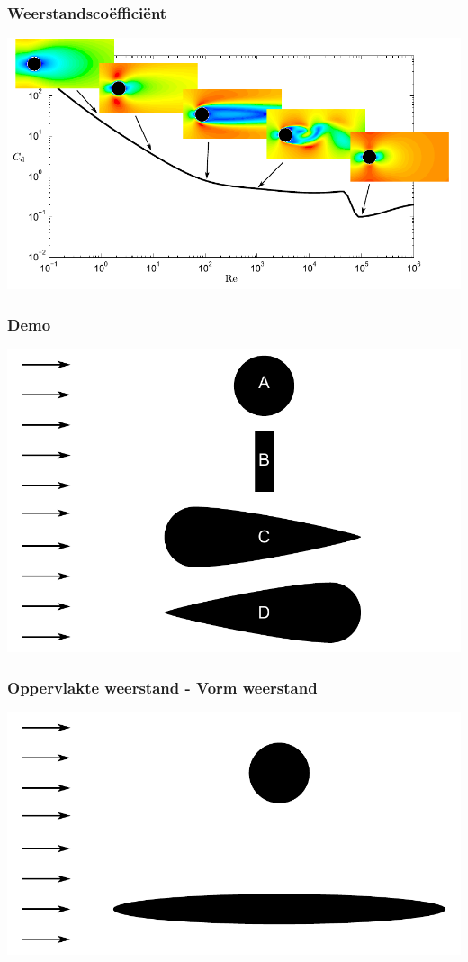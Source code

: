 \documentclass[t]{beamer}
\begin{document}
  	\begin{frame}
  		\frametitle{Weerstandscoëfficiënt}
  		\center
  		\includegraphics[width=\textwidth]{fig/uitwendige_stroming/Cilinderstroming_Cd_snelheidsvelden}
  	\end{frame}
  	\begin{frame}
		\frametitle{Demo}
		\center
    	\includegraphics[height=0.8\textheight]{fig/uitwendige_stroming/Invloed_van_vorm_op_weerstand}
  	\end{frame}
  	\begin{frame}
		\frametitle{Oppervlakte weerstand - Vorm weerstand}
		\center
    	\includegraphics[width=\textwidth]{fig/uitwendige_stroming/Vormweerstand-oppervlakteweerstand}
  	\end{frame}
\end{document}

